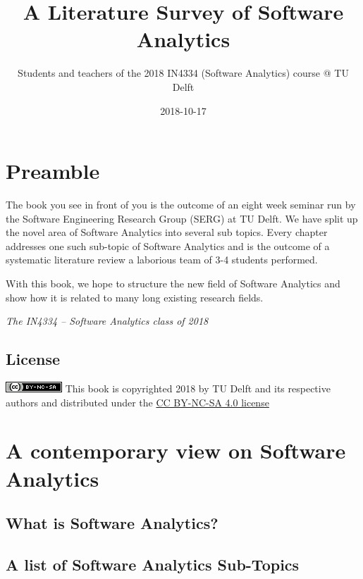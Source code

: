\documentclass[]{book}
\title{A Literature Survey of Software Analytics}
\author{Students and teachers of the 2018 IN4334 (Software Analytics) course @
TU Delft}
\date{2018-10-17}
\begin{document}
\maketitle

{
\hypersetup{linkcolor=black}
\setcounter{tocdepth}{1}
\tableofcontents
}
\chapter{Preamble}\label{intro}

The book you see in front of you is the outcome of an eight week seminar
run by the Software Engineering Research Group (SERG) at TU Delft. We
have split up the novel area of Software Analytics into several sub
topics. Every chapter addresses one such sub-topic of Software Analytics
and is the outcome of a systematic literature review a laborious team of
3-4 students performed.

With this book, we hope to structure the new field of Software Analytics
and show how it is related to many long existing research fields.

\emph{The IN4334 -- Software Analytics class of 2018}

\section{License}\label{license}

\includegraphics{figures/cc-nc-sa.png} This book is copyrighted 2018 by
TU Delft and its respective authors and distributed under the
\href{https://creativecommons.org/licenses/by-nc-sa/4.0/}{CC BY-NC-SA
4.0 license}

\chapter{A contemporary view on Software
Analytics}\label{a-contemporary-view-on-software-analytics}

\section{What is Software Analytics?}\label{what-is-software-analytics}

\section{A list of Software Analytics
Sub-Topics}\label{a-list-of-software-analytics-sub-topics}
\end{document}
